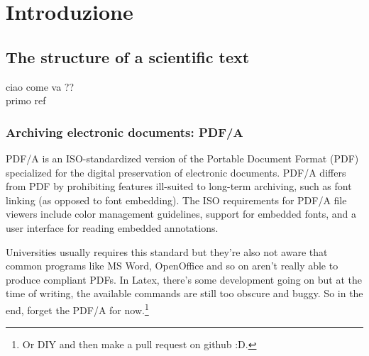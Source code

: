 \chapter{Introduzione}
\label{chap:Introduzione}

\section{The structure of a scientific text}

ciao come va ??\\
primo ref \cite{ranganathan2010-pac}

\subsection{Archiving electronic documents: PDF/A}
PDF/A is an ISO-standardized version of the Portable Document Format (PDF) specialized for the digital preservation of electronic documents. PDF/A differs from PDF by prohibiting features ill-suited to long-term archiving, such as font linking (as opposed to font embedding). The ISO requirements for PDF/A file viewers include color management guidelines, support for embedded fonts, and a user interface for reading embedded annotations.



Universities usually requires this standard but they're also not aware that common programs like MS Word, OpenOffice and so on aren't really able to produce compliant PDFs. In Latex, there's some development going on but at the time of writing, the available commands are still too obscure and buggy. So in the end, forget the PDF/A for now.\footnote{Or DIY and then make a pull request on github :D.}